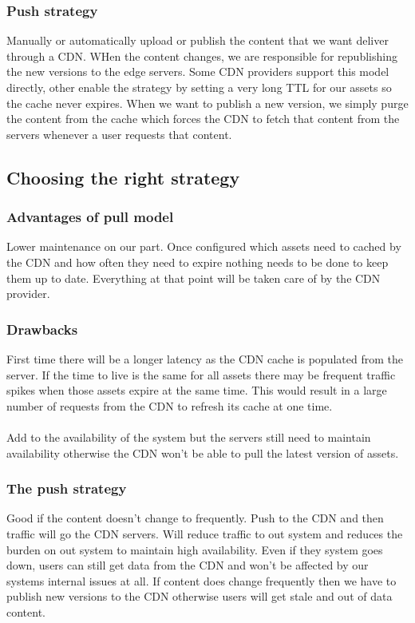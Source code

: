 \documentclass[a4paper, 11pt]{book}
\begin{document}
    \subsubsection{Push strategy}
    Manually or automatically upload or publish the content that we want deliver through a CDN.
    WHen the content changes, we are responsible for republishing the new versions to the edge servers.
    Some CDN providers support this model directly, other enable the strategy by setting a very long TTL for our assets so the cache never expires.
    When we want to publish a new version, we simply purge the content from the cache which forces the CDN to fetch that content from the servers whenever a user requests that content.

    \subsection{Choosing the right strategy}

    \subsubsection{Advantages of pull model}
    Lower maintenance on our part.
    Once configured which assets need to cached by the CDN and how often they need to expire nothing needs to be done to keep them up to date.
    Everything at that point will be taken care of by the CDN provider.

    \subsubsection{Drawbacks}
    First time there will be a longer latency as the CDN cache is populated from the server.
    If the time to live is the same for all assets there may be frequent traffic spikes when those assets expire at the same time.
    This would result in a large number of requests from the CDN to refresh its cache at one time.

    \paragraph{}
    Add to the availability of the system but the servers still need to maintain availability otherwise the CDN won't be able to pull the latest version of assets.

    \subsubsection{The push strategy}
    Good if the content doesn't change to frequently.
    Push to the CDN and then traffic will go the CDN servers.
    Will reduce traffic to out system and reduces the burden on out system to maintain high availability.
    Even if they system goes down, users can still get data from the CDN and won't be affected by our systems internal issues at all.
    If content does change frequently then we have to publish new versions to the CDN otherwise users will get stale and out of data content.
\end{document}

